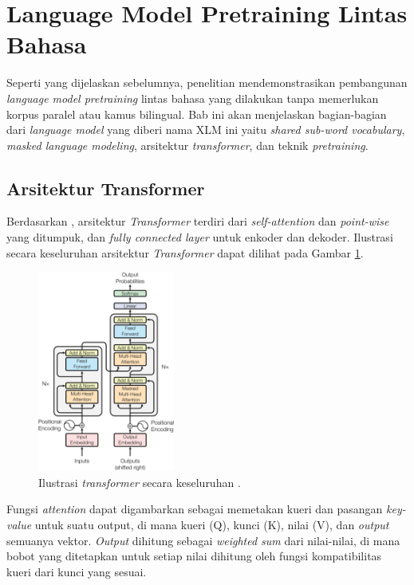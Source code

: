 \section{Language Model Pretraining Lintas Bahasa}
    Seperti yang dijelaskan sebelumnya, penelitian \parencite{LampleConneau2019} mendemonstrasikan pembangunan \textit{language model pretraining} lintas bahasa yang dilakukan tanpa memerlukan korpus paralel atau kamus bilingual. Bab ini akan menjelaskan bagian-bagian dari \textit{language model} yang diberi nama XLM ini yaitu \textit{shared sub-word vocabulary}, \textit{masked language modeling}, arsitektur \textit{transformer}, dan teknik \textit{pretraining}.

    \subsection{Arsitektur Transformer}

    Berdasarkan \parencite{AttentionVaswani2017}, arsitektur \textit{Transformer} terdiri dari \textit{self-attention} dan \textit{point-wise} yang ditumpuk, dan \textit{fully connected layer} untuk enkoder dan dekoder. Ilustrasi secara keseluruhan arsitektur \textit{Transformer} dapat dilihat pada Gambar \ref{fig:ilustrasi_transformer}.

    \begin{figure}[ht]
        \centering
        \includegraphics[width=0.4\textwidth]{resources/overview-transformer.png}
        \caption{Ilustrasi \textit{transformer} secara keseluruhan \parencite{AttentionVaswani2017}.}
        \label{fig:ilustrasi_transformer}
    \end{figure}

    Fungsi \textit{attention} dapat digambarkan sebagai memetakan kueri dan pasangan \textit{key-value} untuk suatu output, di mana kueri (Q), kunci (K), nilai (V), dan \textit{output} semuanya vektor. \textit{Output} dihitung sebagai \textit{weighted sum} dari nilai-nilai, di mana bobot yang ditetapkan untuk setiap nilai dihitung oleh fungsi kompatibilitas kueri dari kunci yang sesuai.


